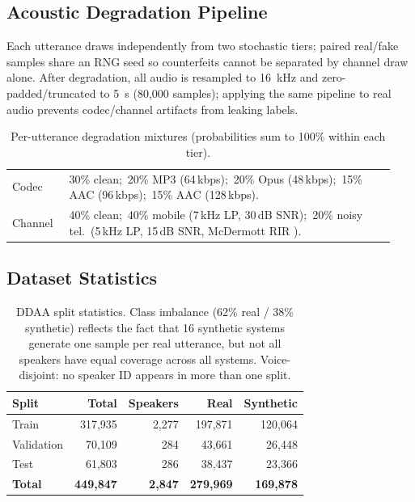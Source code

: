 \documentclass{article}
\newcommand{\ddaa}{\textsc{DDAA}}
\begin{document}
\subsection{Acoustic Degradation Pipeline}

Each utterance draws independently from two stochastic tiers; paired
real/fake samples share an RNG seed so counterfeits cannot be separated by
channel draw alone.  After degradation, all audio is resampled to 16~kHz and
zero-padded/truncated to 5~s (80,000 samples); applying the same pipeline to
real audio prevents codec/channel artifacts from leaking labels.

\begin{table}[h]
  \caption{Per-utterance degradation mixtures (probabilities sum to 100\%
  within each tier).}
  \label{tab:degradation}
  \centering
  \footnotesize
  \begin{tabular}{@{}p{0.14\linewidth}p{0.80\linewidth}@{}}
    \toprule
    Codec &
      30\% clean;\,
      20\% MP3 (64\,kbps);\,
      20\% Opus (48\,kbps);\,
      15\% AAC (96\,kbps);\,
      15\% AAC (128\,kbps). \\
    Channel &
      40\% clean;\,
      40\% mobile (7\,kHz LP, 30\,dB SNR);\,
      20\% noisy tel.\ (5\,kHz LP, 15\,dB SNR, McDermott RIR
      \citep{traer2016statistics}). \\
    \bottomrule
  \end{tabular}
\end{table}

\subsection{Dataset Statistics}

\begin{table}[h]
  \caption{\ddaa{} split statistics. Class imbalance (62\% real / 38\%
  synthetic) reflects the fact that 16 synthetic systems generate one sample
  per real utterance, but not all speakers have equal coverage across all
  systems. Voice-disjoint: no speaker ID appears in more than one split.}
  \label{tab:stats}
  \centering
  \begin{tabular}{lrrrr}
    \toprule
    Split & Total & Speakers & Real & Synthetic \\
    \midrule
    Train      & 317,935 & 2,277 & 197,871 & 120,064 \\
    Validation &  70,109 &   284 &  43,661 &  26,448 \\
    Test       &  61,803 &   286 &  38,437 &  23,366 \\
    \midrule
    \textbf{Total} & \textbf{449,847} & \textbf{2,847} &
      \textbf{279,969} & \textbf{169,878} \\
    \bottomrule
  \end{tabular}
\end{table}
\end{document}
